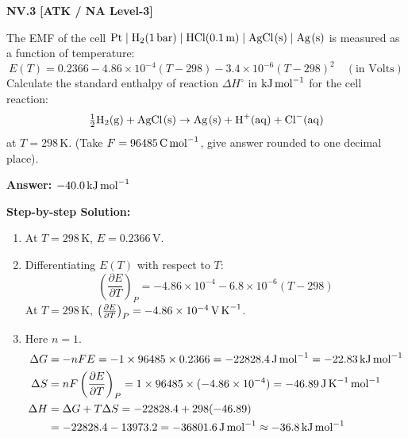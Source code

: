 \begin{problembox}
\textbf{NV.3} \hfill \textbf{[ATK / NA Level-3]}

The EMF of the cell $\ce{Pt} \mid \ce{H2}(1\,\text{bar}) \mid \ce{HCl}(0.1\,\text{m}) \mid \ce{AgCl(s)} \mid \ce{Ag(s)}$ is measured as a function of temperature:
\begin{equation*}
    E(T) = 0.2366 - 4.86 \times 10^{-4}(T - 298) - 3.4 \times 10^{-6}(T - 298)^2 \quad (\text{in Volts})
\end{equation*}
Calculate the standard enthalpy of reaction $\Delta H^\circ$ in $\text{kJ\,mol}^{-1}$ for the cell reaction:
\begin{equation*}
    \tfrac{1}{2}\ce{H2(g)} + \ce{AgCl(s)} \to \ce{Ag(s)} + \ce{H+(aq)} + \ce{Cl^-(aq)}
\end{equation*}
at $T = 298\,\text{K}$. (Take $F = 96485\,\text{C\,mol}^{-1}$, give answer rounded to one decimal place).
\end{problembox}
\begin{solution}
\textbf{Answer: $-40.0\,\text{kJ\,mol}^{-1}$}

\textbf{Step-by-step Solution:}
\begin{enumerate}
    \item At $T = 298\,\text{K}$, $E = 0.2366\,\text{V}$.
    \item Differentiating $E(T)$ with respect to $T$:
    \begin{equation*}
        \left(\frac{\partial E}{\partial T}\right)_P = -4.86 \times 10^{-4} - 6.8 \times 10^{-6}(T - 298)
    \end{equation*}
    At $T = 298\,\text{K}$, $\left(\frac{\partial E}{\partial T}\right)_P = -4.86 \times 10^{-4}\,\text{V\,K}^{-1}$.
    \item Here $n = 1$.
    \begin{align*}
        \Delta G &= -nFE = -1 \times 96485 \times 0.2366 = -22828.4\,\text{J\,mol}^{-1} = -22.83\,\text{kJ\,mol}^{-1} \\
        \Delta S &= nF\left(\frac{\partial E}{\partial T}\right)_P = 1 \times 96485 \times (-4.86 \times 10^{-4}) = -46.89\,\text{J\,K}^{-1}\,\text{mol}^{-1} \\
        \Delta H &= \Delta G + T\Delta S = -22828.4 + 298(-46.89) \\
        &= -22828.4 - 13973.2 = -36801.6\,\text{J\,mol}^{-1} \approx -36.8\,\text{kJ\,mol}^{-1}
    \end{align*}
\end{enumerate}
\end{solution}


